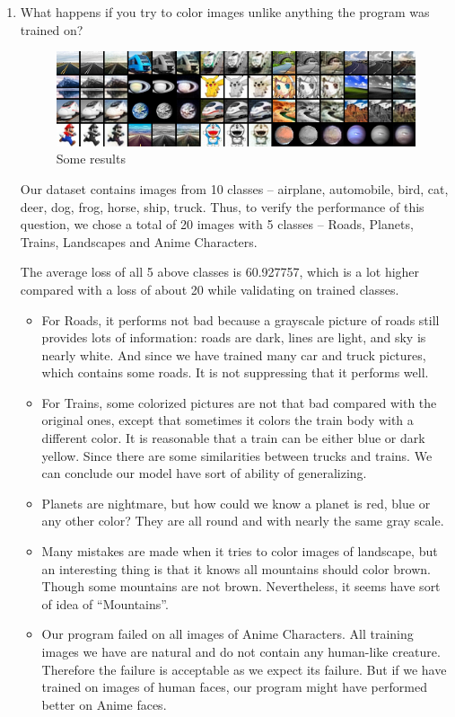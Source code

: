 \documentclass[letter]{article}
\begin{document}
\begin{itemize}
\begin{enumerate}
		\item {What happens if you try to color images unlike anything the program was trained on?}
		\begin{figure}[H]
			\centering
			\includegraphics[width=\textwidth]{figs/untrained.png}
			\caption{Some results}
			\label{untrained}
		\end{figure}
		\par{Our dataset contains images from 10 classes -- airplane, automobile, bird, cat, deer, dog, frog, horse, ship, truck. Thus, to verify the performance of this question, we chose a total of 20 images with 5 classes -- Roads, Planets, Trains, Landscapes and Anime Characters. }
		\par{The average loss of all 5 above classes is 60.927757, which is a lot higher compared with a loss of about 20 while validating on trained classes.}
		\begin{itemize}
			\item {For Roads, it performs not bad because a grayscale picture of roads still provides lots of information: roads are dark, lines are light, and sky is nearly white. And since we have trained many car and truck pictures, which contains some roads. It is not suppressing that it performs well.}
			\item {For Trains, some colorized pictures are not that bad compared with the original ones, except that sometimes it colors the train body with a different color. It is reasonable that a train can be either blue or dark yellow. Since there are some similarities between trucks and trains. We can conclude our model have sort of ability of generalizing.}
			\item {Planets are nightmare, but how could we know a planet is red, blue or any other color? They are all round and with nearly the same gray scale.}
			\item {Many mistakes are made when it tries to color images of landscape, but an interesting thing is that it knows all mountains should color brown. Though some mountains are not brown. Nevertheless, it seems have sort of idea of ``Mountains''.}
			\item {Our program failed on all images of Anime Characters. All training images we have are natural and do not contain any human-like creature. Therefore the failure is acceptable as we expect its failure. But if we have trained on images of human faces, our program might have performed better on Anime faces.}

\end{itemize}
\end{enumerate}
\end{itemize}
\end{document}
